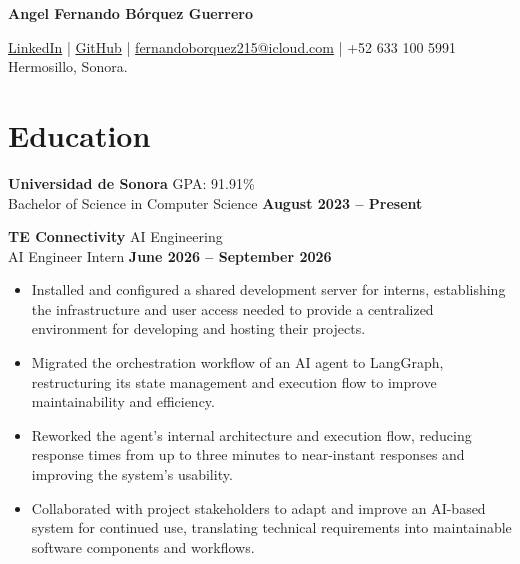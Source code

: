 \documentclass[11pt]{article}
\begin{document}
{\Huge \textbf{Angel Fernando Bórquez Guerrero}} \\
\vspace{-0.4cm}
\par \href{https://www.linkedin.com/in/fernandoborquez/}{LinkedIn} \quad | \quad
\href{https://github.com/FernyBoy}{GitHub} \quad | \quad
\href{mailto:fernandoborquez215@icloud.com}{fernandoborquez215@icloud.com} \quad | \quad
+52 633 100 5991 \\
Hermosillo, Sonora.





\section*{Education}
\textbf{Universidad de Sonora} \hfill GPA: 91.91\%\\
Bachelor of Science in Computer Science \hfill \textbf{August 2023 -- Present}





\textbf{TE Connectivity} \hfill AI Engineering\\
AI Engineer Intern \hfill \textbf{June 2026 -- September 2026}
\vspace{-0.3cm}
\begin{itemize}[leftmargin=*]
    \item Installed and configured a shared development server for interns, establishing the infrastructure and user access needed to provide a centralized environment for developing and hosting their projects.
    
    \vspace{-0.3cm}
    \item Migrated the orchestration workflow of an AI agent to LangGraph, restructuring its state management and execution flow to improve maintainability and efficiency.
    
    \vspace{-0.3cm}
    \item Reworked the agent's internal architecture and execution flow, reducing response times from up to three minutes to near-instant responses and improving the system's usability.
    
    \vspace{-0.3cm}
    \item Collaborated with project stakeholders to adapt and improve an AI-based system for continued use, translating technical requirements into maintainable software components and workflows.
\end{itemize}
\end{document}
